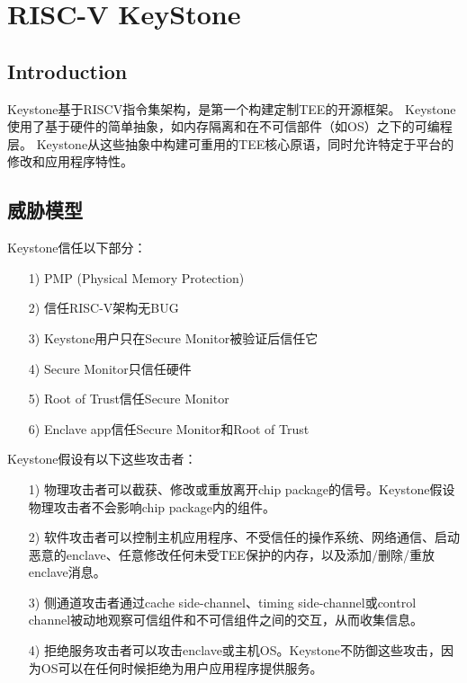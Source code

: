 
\chapter{RISC-V KeyStone} %

\label{Chapter4} %

\section{Introduction}
Keystone\cite{keystone-p1}基于RISCV\cite{keystone-p2}指令集架构，是第一个构建定制TEE的开源框架。
Keystone使用了基于硬件的简单抽象，如内存隔离和在不可信部件（如OS）之下的可编程层。
Keystone从这些抽象中构建可重用的TEE核心原语，同时允许特定于平台的修改和应用程序特性。

\section{威胁模型}
Keystone信任以下部分：
\begin{itemize}
	\item [1)]
	PMP (Physical Memory Protection)
	\item [2)]
	信任RISC-V架构无BUG
	\item [3)]
	Keystone用户只在Secure Monitor被验证后信任它
	\item [4)]
	Secure Monitor只信任硬件
	\item [5)]
	Root of Trust信任Secure Monitor
	\item [6)]
	Enclave app信任Secure Monitor和Root of Trust
\end{itemize}
Keystone假设有以下这些攻击者：
\begin{itemize}
	\item [1)]
	物理攻击者可以截获、修改或重放离开chip package的信号。Keystone假设物理攻击者不会影响chip package内的组件。
	\item [2)]
	软件攻击者可以控制主机应用程序、不受信任的操作系统、网络通信、启动恶意的enclave、任意修改任何未受TEE保护的内存，以及添加/删除/重放enclave消息。
	\item [3)]
	侧通道攻击者通过cache side-channel、timing side-channel或control channel被动地观察可信组件和不可信组件之间的交互，从而收集信息。
	\item [4)]	
	拒绝服务攻击者可以攻击enclave或主机OS。Keystone不防御这些攻击，因为OS可以在任何时候拒绝为用户应用程序提供服务。
\end{itemize}


